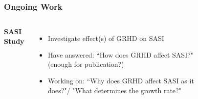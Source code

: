 \documentclass{beamer}
\begin{document}
\begin{frame}
\frametitle{Ongoing Work}

\begin{columns}[c]


\textbf{SASI Study}
\begin{itemize}
  \item Investigate effect(s) of GRHD on SASI
  \item Have answered: ``How does GRHD affect SASI?"
        (enough for publication?)
  \item Working on: ``Why does GRHD affect SASI as it does?"/
        "What determines the growth rate?"
\end{itemize}


\begin{figure}
\captionsetup[subfigure]{labelformat=empty}

\centering



\end{figure}
\end{columns}
\end{frame}
\end{document}

